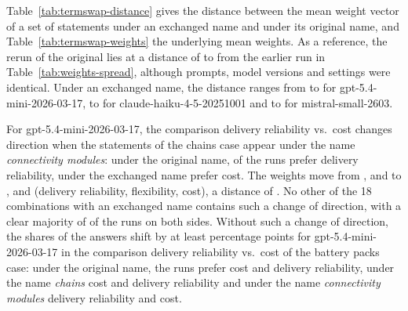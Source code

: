 Table~\ref{tab:termswap-distance} gives the distance between the mean weight vector
of a set of statements under an exchanged name and under its original name, and
Table~\ref{tab:termswap-weights} the underlying mean weights. As a reference, the
rerun of the original lies at a distance of  to
 from the earlier run in Table~\ref{tab:weights-spread},
although prompts, model versions and settings were identical. Under an exchanged
name, the distance ranges from  to
 for gpt-5.4-mini-2026-03-17,
 to
 for claude-haiku-4-5-20251001 and
 to 
for mistral-small-2603.

For gpt-5.4-mini-2026-03-17, the comparison delivery reliability vs.\ cost changes
direction when the statements of the chains case appear under the name
\emph{connectivity modules}: under the original name,
of the runs prefer delivery reliability, under the exchanged name
prefer cost. The weights move from
,
 and
 to
,
 and
 (delivery
reliability, flexibility, cost), a distance of
. No other of
the 18 combinations with an exchanged name contains such a change of direction, with
a clear majority of  of the runs on both sides. Without
such a change of direction, the shares of the answers shift by at least
 percentage points for gpt-5.4-mini-2026-03-17 in the
comparison delivery reliability vs.\ cost of the battery packs case: under the
original name, the runs prefer
cost and
delivery reliability, under the name \emph{chains}
cost and
delivery reliability and under the name \emph{connectivity modules}
delivery reliability and
cost.

